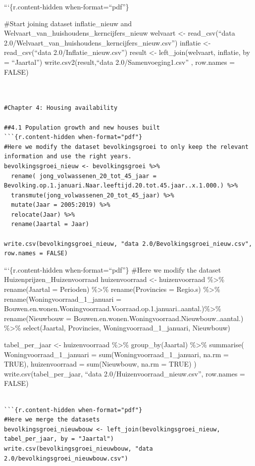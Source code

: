 \documentclass[
]{article}
\begin{document}
```\{r.content-hidden when-format=``pdf''\}

\#Start joining dataset inflatie\_nieuw and
Welvaart\_van\_huishoudens\_kerncijfers\_nieuw welvaart \textless-
read\_csv(``data
2.0/Welvaart\_van\_huishoudens\_kerncijfers\_nieuw.csv'') inflatie
\textless- read\_csv(``data 2.0/Inflatie\_nieuw.csv'') result \textless-
left\_join(welvaart, inflatie, by = ``Jaartal'')
write.csv2(result,``data 2.0/Samenvoeging1.csv'' , row.names = FALSE)

\begin{verbatim}


#Chapter 4: Housing availability

##4.1 Population growth and new houses built
```{r.content-hidden when-format="pdf"}
#Here we modify the dataset bevolkingsgroei to only keep the relevant information and use the right years.
bevolkingsgroei_nieuw <- bevolkingsgroei %>%
  rename( jong_volwassenen_20_tot_45_jaar = Bevolking.op.1.januari.Naar.leeftijd.20.tot.45.jaar..x.1.000.) %>%
  transmute(jong_volwassenen_20_tot_45_jaar) %>%
  mutate(Jaar = 2005:2019) %>%
  relocate(Jaar) %>%
  rename(Jaartal = Jaar)

write.csv(bevolkingsgroei_nieuw, "data 2.0/Bevolkingsgroei_nieuw.csv", row.names = FALSE)
\end{verbatim}

```\{r.content-hidden when-format=``pdf''\} \#Here we modify the dataset
Huizenprijzen\_Huizenvoorraad huizenvoorraad \textless- huizenvoorraad
\%\textgreater\% rename(Jaartal = Perioden) \%\textgreater\%
rename(Provincies = Regio.s) \%\textgreater\%
rename(Woningvoorraad\_1\_januari =
Bouwen.en.wonen.Woningvoorraad.Voorraad.op.1.januari..aantal.)\%\textgreater\%
rename(Nieuwbouw = Bouwen.en.wonen.Woningvoorraad.Nieuwbouw..aantal.)
\%\textgreater\% select(Jaartal, Provincies, Woningvoorraad\_1\_januari,
Nieuwbouw)

tabel\_per\_jaar \textless- huizenvoorraad \%\textgreater\%
group\_by(Jaartal) \%\textgreater\% summarise(
Woningvoorraad\_1\_januari = sum(Woningvoorraad\_1\_januari, na.rm =
TRUE), huizenvoorraad = sum(Nieuwbouw, na.rm = TRUE) )
write.csv(tabel\_per\_jaar, ``data 2.0/Huizenvoorraad\_nieuw.csv'',
row.names = FALSE)

\begin{verbatim}

```{r.content-hidden when-format="pdf"}
#Here we merge the datasets
bevolkingsgroei_nieuwbouw <- left_join(bevolkingsgroei_nieuw, tabel_per_jaar, by = "Jaartal")
write.csv(bevolkingsgroei_nieuwbouw, "data 2.0/bevolkingsgroei_nieuwbouw.csv")
\end{verbatim}
\end{document}
